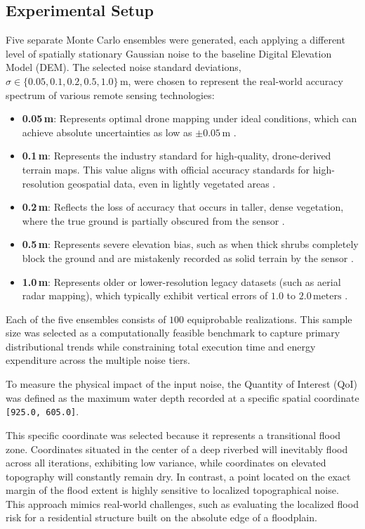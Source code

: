 \subsection{Experimental Setup}
Five separate Monte Carlo ensembles were generated, each applying a different level of spatially stationary Gaussian noise to the baseline Digital Elevation Model (DEM). The selected noise standard deviations, $\sigma \in \{0.05, 0.1, 0.2, 0.5, 1.0\}\,\text{m}$, were chosen to represent the real-world accuracy spectrum of various remote sensing technologies:
\begin{itemize}
    \item \textbf{0.05\,m}: Represents optimal drone mapping under ideal conditions, which can achieve absolute uncertainties as low as $\pm 0.05\,\text{m}$ \cite{VanderSluijs2026}.
    \item \textbf{0.1\,m}: Represents the industry standard for high-quality, drone-derived terrain maps. This value aligns with official accuracy standards for high-resolution geospatial data, even in lightly vegetated areas \cite{VanderSluijs2026, ASPRS2015Standards}.
    \item \textbf{0.2\,m}: Reflects the loss of accuracy that occurs in taller, dense vegetation, where the true ground is partially obscured from the sensor \cite{VanderSluijs2026}.
    \item \textbf{0.5\,m}: Represents severe elevation bias, such as when thick shrubs completely block the ground and are mistakenly recorded as solid terrain by the sensor \cite{VanderSluijs2026}.
    \item \textbf{1.0\,m}: Represents older or lower-resolution legacy datasets (such as aerial radar mapping), which typically exhibit vertical errors of $1.0$ to $2.0\,\text{meters}$ \cite{ASPRS2015Standards}.
\end{itemize}

Each of the five ensembles consists of $100$ equiprobable realizations. This sample size was selected as a computationally feasible benchmark to capture primary distributional trends while constraining total execution time and energy expenditure across the multiple noise tiers.

To measure the physical impact of the input noise, the Quantity of Interest (QoI) was defined as the maximum water depth recorded at a specific spatial coordinate \texttt{[925.0, 605.0]}. 

This specific coordinate was selected because it represents a transitional flood zone. Coordinates situated in the center of a deep riverbed will inevitably flood across all iterations, exhibiting low variance, while coordinates on elevated topography will constantly remain dry. In contrast, a point located on the exact margin of the flood extent is highly sensitive to localized topographical noise. This approach mimics real-world challenges, such as evaluating the localized flood risk for a residential structure built on the absolute edge of a floodplain.

